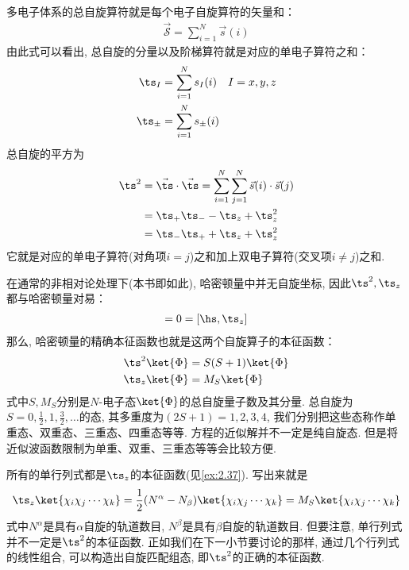 多电子体系的总自旋算符就是每个电子自旋算符的矢量和：
\begin{align}
\vec{\mathscr{S}} = \sum_{i=1}^{N}\vec{s}(i)
\end{align}
由此式可以看出, 
总自旋的分量以及阶梯算符就是对应的单电子算符之和：
\begin{subequations}
	\begin{align}
	\ts_I   & = \sum_{i=1}^{N}s_I(i)\quad I=x,y,z\\
	\ts_\pm & = \sum_{i=1}^{N}s_\pm(i) 
	\end{align}
\end{subequations}
总自旋的平方为
\begin{align}
\ts^2 & = \vec{\ts}\cdot\vec{\ts} = \sum_{i=1}^{N}\sum_{j=1}^{N} \vec{s}(i)\cdot\vec{s}(j) \notag \\
      & = \ts_+\ts_- - \ts_z + \ts^2_z\notag\\
      & = \ts_-\ts_+ + \ts_z + \ts^2_z
\end{align}
它就是对应的单电子算符(对角项$i=j$)之和加上双电子算符(交叉项$i\neq j$)之和.


在通常的非相对论处理下(本书即如此), 
哈密顿量中并无自旋坐标, 
因此$\ts^2,\ts_z$都与哈密顿量对易：
\begin{align}
[\hs,\ts^2] = 0 = [\hs,\ts_z]
\end{align} 
那么, 
哈密顿量的精确本征函数也就是这两个自旋算子的本征函数：
\begin{subequations}
	\begin{align}
	\ts^2\ket{\Phi} & = S(S+1)\ket{\Phi}\\
	\ts_z\ket{\Phi} & = M_S\ket{\Phi}
	\end{align}
\end{subequations}
式中$S,M_S$分别是$N$-电子态$\ket{\Phi}$的总自旋量子数及其分量. 
总自旋为$S=0,\frac{1}{2},1,\frac{3}{2},\ldots$的态, 
其多重度为$(2S+1)=1,2,3,4$, 
我们分别把这些态称作单重态、双重态、三重态、四重态等等. 
\sch 方程的近似解并不一定是纯自旋态. 
但是将近似波函数限制为单重、双重、三重态等等会比较方便.


所有的单行列式都是$\ts_z$的本征函数(见\autoref{ex:2.37}). 
写出来就是
\begin{align}
\label{eq:2.254}
\ts_z\ket{\chi_i\chi_j\cdots\chi_k} = \frac{1}{2}(N^\alpha - N_\beta)\ket{\chi_i\chi_j\cdots\chi_k} = M_S\ket{\chi_i\chi_j\cdots\chi_k}
\end{align}
式中$N^\alpha$是具有$\alpha$自旋的轨道数目, 
$N^\beta$是具有$\beta$自旋的轨道数目. 
但要注意, 
单行列式并不一定是$\ts^2$的本征函数. 
正如我们在下一小节要讨论的那样, 
通过几个行列式的线性组合, 
可以构造出自旋匹配组态, 
即$\ts^2$的正确的本征函数.

